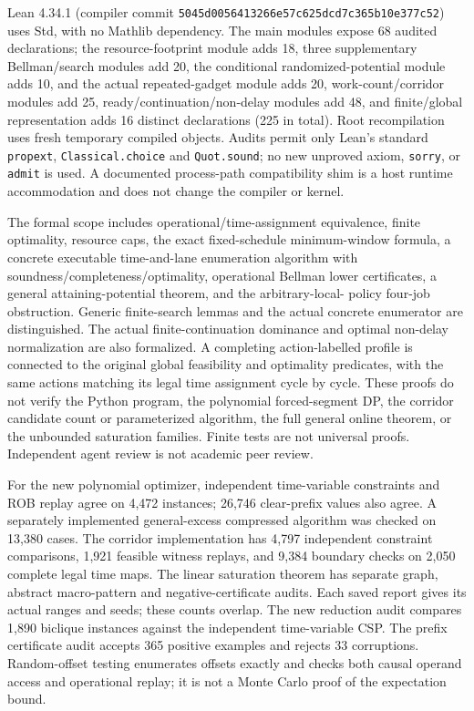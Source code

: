 \documentclass[11pt]{article}
\begin{document}
Lean 4.34.1 (compiler commit
\texttt{5045d0056413266e57c625dcd7c365b10e377c52}) uses Std, with no Mathlib
dependency. The main modules expose 68 audited declarations; the resource-footprint
module adds 18, three supplementary Bellman/search modules add 20,
the conditional randomized-potential module adds 10, and the actual
repeated-gadget module adds 20, work-count/corridor modules add 25,
ready/continuation/non-delay modules add 48, and finite/global
representation adds 16 distinct declarations (225 in total). Root
recompilation uses fresh temporary compiled objects. Audits permit only
Lean's standard \texttt{propext}, \texttt{Classical.choice} and
\texttt{Quot.sound}; no new unproved axiom, \texttt{sorry}, or \texttt{admit}
is used. A documented process-path compatibility shim is a host runtime
accommodation and does not change the compiler or kernel.

The formal scope includes operational/time-assignment equivalence, finite
optimality, resource caps, the exact fixed-schedule minimum-window formula,
a concrete executable time-and-lane enumeration
algorithm with soundness/completeness/optimality, operational Bellman lower
certificates, a general attaining-potential theorem, and the arbitrary-local-
policy four-job obstruction. Generic finite-search lemmas and the actual
concrete enumerator are distinguished.
The actual finite-continuation dominance and optimal non-delay normalization
are also formalized. A completing action-labelled profile is connected to
the original global feasibility and optimality predicates, with the same
actions matching its legal time assignment cycle by cycle.
These proofs do not verify the
Python program, the polynomial forced-segment DP, the corridor candidate
count or parameterized algorithm, the full general
online theorem, or the unbounded saturation families. Finite tests are not
universal proofs. Independent agent review is not academic peer review.

For the new polynomial optimizer, independent time-variable constraints
and ROB replay agree on 4,472 instances; 26,746 clear-prefix values also
agree. A separately implemented general-excess compressed algorithm was
checked on 13,380 cases. The corridor implementation has 4,797 independent
constraint comparisons, 1,921 feasible witness replays, and 9,384 boundary
checks on 2,050 complete legal time maps. The linear saturation theorem
has separate graph, abstract macro-pattern and negative-certificate audits.
Each saved report gives its actual ranges and seeds; these counts overlap.
The new reduction audit compares 1,890 biclique instances against the
independent time-variable CSP. The prefix certificate audit accepts 365
positive examples and rejects 33 corruptions. Random-offset testing
enumerates offsets exactly and checks both causal operand access and
operational replay; it is not a Monte Carlo proof of the expectation bound.
\end{document}
